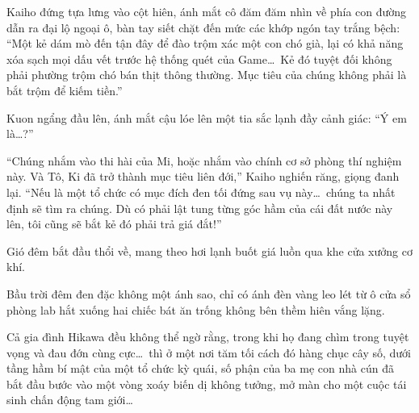 \documentclass[../main.tex]{subfiles}
\begin{document}
Kaiho đứng tựa lưng vào cột hiên, ánh mắt cô đăm đăm nhìn về phía con đường dẫn ra đại lộ ngoại ô, bàn tay siết chặt đến mức các khớp ngón tay trắng bệch: ``Một kẻ dám mò đến tận đây để đào trộm xác một con chó già, lại có khả năng xóa sạch mọi dấu vết trước hệ thống quét của Game\dots\ Kẻ đó tuyệt đối không phải phường trộm chó bán thịt thông thường. Mục tiêu của chúng không phải là bắt trộm để kiếm tiền.''

Kuon ngẩng đầu lên, ánh mắt cậu lóe lên một tia sắc lạnh đầy cảnh giác: ``Ý em là\dots?''

``Chúng nhắm vào thi hài của Mi, hoặc nhắm vào chính cơ sở phòng thí nghiệm này. Và Tô, Ki đã trở thành mục tiêu liên đới,'' Kaiho nghiến răng, giọng đanh lại. ``Nếu là một tổ chức có mục đích đen tối đứng sau vụ này\dots\ chúng ta nhất định sẽ tìm ra chúng. Dù có phải lật tung từng góc hầm của cái đất nước này lên, tôi cũng sẽ bắt kẻ đó phải trả giá đắt!''

Gió đêm bắt đầu thổi về, mang theo hơi lạnh buốt giá luồn qua khe cửa xưởng cơ khí.

Bầu trời đêm đen đặc không một ánh sao, chỉ có ánh đèn vàng leo lét từ ô cửa sổ phòng lab hắt xuống hai chiếc bát ăn trống không bên thềm hiên vắng lặng.

Cả gia đình Hikawa đều không thể ngờ rằng, trong khi họ đang chìm trong tuyệt vọng và đau đớn cùng cực\dots\ thì ở một nơi tăm tối cách đó hàng chục cây số, dưới tầng hầm bí mật của một tổ chức kỳ quái, số phận của ba mẹ con nhà cún đã bắt đầu bước vào một vòng xoáy biến dị không tưởng, mở màn cho một cuộc tái sinh chấn động tam giới\dots
\end{document}
